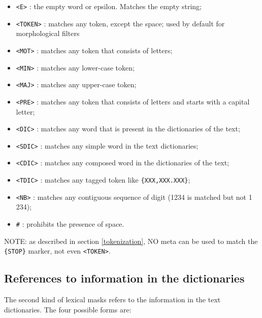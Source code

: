 \bigskip
{}
\index{\verb+#+}
\begin{itemize}
  \item \verb+<E>+ : the empty word or epsilon. Matches the empty string;
  \item \verb+<TOKEN>+ : matches any token, except the space; used by default
  for morphological filters
  \item \verb+<MOT>+ : matches any token that consists of letters;
  \item \verb+<MIN>+ : matches any lower-case token;
  \item \verb+<MAJ>+ : matches any upper-case token;
  \item \verb+<PRE>+ : matches any token that consists of letters and starts
  with a capital letter;
  \item \verb+<DIC>+ : matches any word that is present in the dictionaries of
  the text;
  \item \verb+<SDIC>+ : matches any simple word in the text
  dictionaries;
  \item \verb+<CDIC>+ : matches any composed word in the dictionaries of the
  text;
  \item \verb+<TDIC>+ : matches any tagged token like \verb+{XXX,XXX.XXX}+;
  \item \verb+<NB>+ : matches any contiguous sequence of digit (1234 is matched
  but not 1 234);
  \item \verb+#+ : prohibits the presence of space.
\end{itemize}

\bigskip
\noindent NOTE: as described in section \ref{tokenization}, NO meta can be used
to match the \verb+{STOP}+ marker, not even \verb+<TOKEN>+.

\subsection{References to information in the dictionaries}


The second kind of lexical masks refers to the information in the
text dictionaries.
 The four possible forms are:

